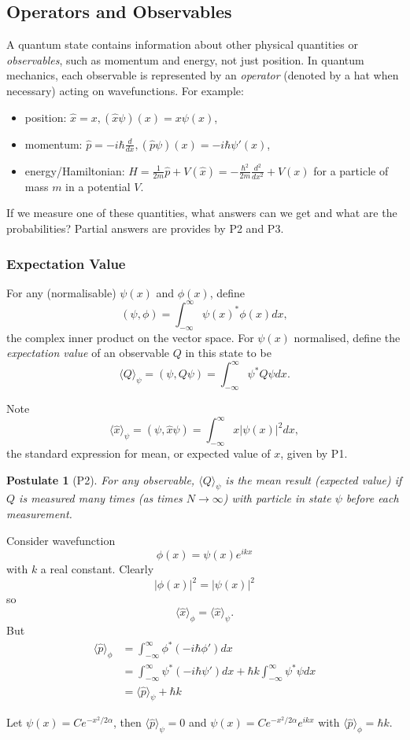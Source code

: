 \documentclass[a4paper]{article}
\newtheorem*{postulate}{Postulate}
\begin{document}
\subsection{Operators and Observables}

A quantum state contains information about other physical quantities or \emph{observables}, such as momentum and energy, not just position. In quantum mechanics, each observable is represented by an \emph{operator} (denoted by a hat when necessary) acting on wavefunctions. For example:
\begin{itemize}
  \item position: $\hat x = x, (\hat{x}\psi)(x) = x\psi(x)$,
  \item momentum: $\hat{p} = -i\hbar \frac{d}{dx}, (\hat{p}\psi)(x) = -i\hbar\psi'(x)$,
  \item energy/Hamiltonian: $H = \frac{1}{2m}\hat{p} + V(\hat{x}) = -\frac{\hbar^2}{2m}\frac{d^2}{dx^2} + V(x)$ for a particle of mass $m$ in a potential $V$.
  \end{itemize}

If we measure one of these quantities, what answers can we get and what are the probabilities? Partial answers are provides by P2 and P3.

\subsubsection{Expectation Value}

For any (normalisable) $\psi(x)$ and $\phi(x)$, define
\[
  (\psi, \phi) = \int_{-\infty}^\infty \psi(x)^* \phi(x) dx,
\]
the complex inner product on the vector space. For $\psi(x)$ normalised, define the \emph{expectation value} of an observable $Q$ in this state to be
\[
  \langle Q \rangle_\psi = (\psi, Q\psi) = \int_{-\infty}^\infty \psi^* Q\psi dx.
\]

Note
\[
  \langle \hat x \rangle_\psi = (\psi, \hat x \psi) = \int_{-\infty}^\infty x |\psi(x)|^2 dx,
\]
the standard expression for mean, or expected value of $x$, given by P1.

\begin{postulate}[P2]
  \label{postulate:2}
  For any observable, $\langle Q\rangle_\psi$ is the mean result (expected value) if $Q$ is measured many times (as times $N\to\infty$) with particle in state $\psi$ before each measurement.
\end{postulate}

Consider wavefunction
\[
  \phi(x) = \psi(x)e^{ikx}
\]
with $k$ a real constant. Clearly
\[
  |\phi(x)|^2 = |\psi(x)|^2
\]
so
\[
  \langle \hat x\rangle_\phi = \langle \hat x\rangle_\psi.
\]
But
\begin{align*}
  \langle\hat p\rangle_\phi &= \int_{-\infty}^\infty \phi^*(-i\hbar\phi')dx \\
  &= \int_{-\infty}^\infty \psi^*(-i\hbar\psi')dx + \hbar k\int_{-\infty}^\infty \psi^*\psi dx \\
  &= \langle \hat p\rangle_\psi + \hbar k
\end{align*}

\begin{eg}
  Let $\psi(x) = Ce^{-x^2/2\alpha}$, then $\langle\hat p\rangle_\psi = 0$ and $\psi(x) = Ce^{-x^2/2\alpha}e^{ikx}$ with $\langle\hat p\rangle_\phi = \hbar k$.
\end{eg}
\end{document}
